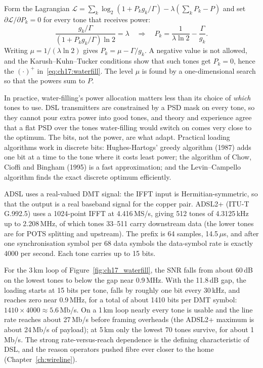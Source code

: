 \begin{deeper}
Form the Lagrangian $\mathcal L=\sum_k\log_2(1+P_kg_k/\Gamma)-\lambda(\sum_kP_k-P)$ and set
$\partial\mathcal L/\partial P_k=0$ for every tone that receives power:
\begin{equation}
\frac{g_k/\Gamma}{(1+P_kg_k/\Gamma)\ln2}=\lambda\quad\Longrightarrow\quad P_k=\frac1{\lambda\ln2}-\frac{\Gamma}{g_k}.
\end{equation}
Writing $\mu=1/(\lambda\ln2)$ gives $P_k=\mu-\Gamma/g_k$. A negative value is not allowed, and the
Karush--Kuhn--Tucker conditions show that such tones get $P_k=0$, hence the $(\cdot)^+$ in~\eqref{eq:ch17:waterfill}.
The level $\mu$ is found by a one-dimensional search so that the powers sum to $P$.
\end{deeper}

In practice, water-filling's power allocation matters less than its choice of \emph{which} tones to use. DSL
transmitters are constrained by a PSD mask on every tone, so they cannot pour extra power into good tones, and
theory and experience agree that a flat PSD over the tones water-filling would switch on comes very close to
the optimum. The bits, not the power, are what adapt. Practical loading algorithms work in discrete bits:
Hughes-Hartogs' greedy algorithm (1987) adds one bit at a time to the tone where it costs least power; the
algorithm of Chow, Cioffi and Bingham (1995) is a fast approximation; and the Levin--Campello algorithm finds the
exact discrete optimum efficiently.

\begin{worked}
ADSL uses a real-valued DMT signal: the IFFT input is Hermitian-symmetric, so that the output is a real baseband
signal for the copper pair. ADSL2+ (ITU-T G.992.5) uses a 1024-point IFFT at 4.416\,MS/s, giving 512 tones of
4.3125\,kHz up to 2.208\,MHz, of which tones 33--511 carry downstream data (the lower tones are for POTS
splitting and upstream). The prefix is 64 samples, 14.5\,$\mu$s, and after one synchronisation symbol per 68
data symbols the data-symbol rate is exactly 4000 per second. Each tone carries up to 15 bits.

For the 3\,km loop of Figure~\ref{fig:ch17_waterfill}, the SNR falls from about 60\,dB on the lowest tones to below the
gap near 0.9\,MHz. With the 11.8\,dB gap, the loading starts at 15 bits per tone, falls by roughly one bit every
30\,kHz, and reaches zero near 0.9\,MHz, for a total of about 1410 bits per DMT symbol: $1410\times4000\approx5.6$\,Mb/s.
On a 1\,km loop nearly every tone is usable and the line rate reaches about 27\,Mb/s before framing overheads
(the ADSL2+ maximum is about 24\,Mb/s of payload); at 5\,km only the lowest 70 tones survive, for about 1\,Mb/s.
The strong rate-versus-reach dependence is the defining characteristic of DSL, and the reason operators pushed
fibre ever closer to the home (Chapter~\ref{ch:wireline}).
\end{worked}

